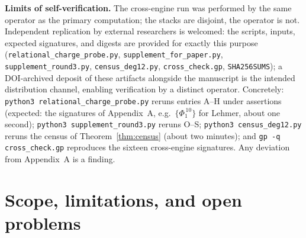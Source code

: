 \documentclass[11pt]{article}
\theoremstyle{plain}
\theoremstyle{definition}
\theoremstyle{remark}
\begin{document}
\textbf{Limits of self-verification.} The cross-engine run was performed by
the same operator as the primary computation; the stacks are disjoint, the
operator is not. Independent replication by external researchers is welcomed:
the scripts, inputs, expected signatures, and digests are provided for
exactly this purpose (\texttt{relational\_charge\_probe.py},
\texttt{supplement\_for\_paper.py}, \texttt{supplement\_round3.py},
\texttt{census\_deg12.py}, \texttt{cross\_check.gp},
\texttt{SHA256SUMS}); a DOI-archived deposit of
these artifacts alongside the manuscript is the intended distribution
channel, enabling verification by a distinct operator. Concretely:
\texttt{python3 relational\_charge\_probe.py} reruns entries A--H under
assertions (expected: the signatures of Appendix~A, e.g.\
$\{\Phi_1^{\,10}\}$ for Lehmer, about one second);
\texttt{python3 supplement\_round3.py} reruns O--S;
\texttt{python3 census\_deg12.py} reruns the census of
Theorem~\ref{thm:census} (about two minutes); and
\texttt{gp -q cross\_check.gp} reproduces the sixteen cross-engine
signatures. Any deviation from Appendix~A is a finding.

\section{Scope, limitations, and open problems}\label{sec:open}
\end{document}
